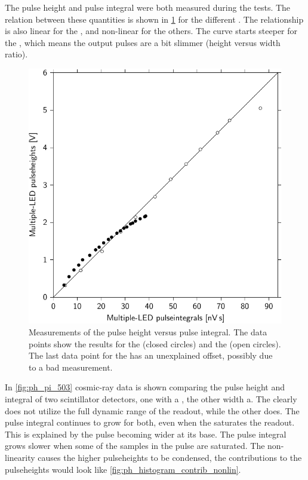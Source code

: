 The pulse height and pulse integral were both measured during the tests. The relation between these quantities is shown in \cref{fig:ph_pi_compared_nikhef_senstech} for the different \pmts. The relationship is also linear for the \nikhef \pmt, and non-linear for the others. The curve starts steeper for the \senstech \pmt, which means the output pulses are a bit slimmer (height versus width ratio).

\begin{figure}
    \centering
    \includegraphics[width=0.7\linewidth]
                    {plots/station/ph_pi_compared_nikhef_senstech}
    \caption{Measurements of the pulse height versus pulse integral. The data points show the results for the \senstech \pmt (closed circles) and the \nikhef \pmt (open circles). The last data point for the \nikhef \pmt has an unexplained offset, possibly due to a bad measurement.}
    \label{fig:ph_pi_compared_nikhef_senstech}
\end{figure}

In \cref{fig:ph_pi_503} cosmic-ray data is shown comparing the pulse height and integral of two scintillator detectors, one with a \nikhef \pmt, the other width a\senstech \pmt. The \senstech \pmt clearly does not utilize the full dynamic range of the readout, while the other does. The pulse integral continues to grow for both, even when the \nikhef \pmt saturates the readout. This is explained by the pulse becoming wider at its base. The pulse integral grows slower when some of the samples in the pulse are saturated. The non-linearity causes the higher pulseheights to be condensed, the contributions to the pulseheights would look like \cref{fig:ph_histogram_contrib_nonlin}.

